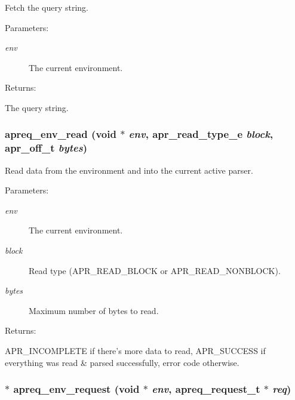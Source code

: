 Fetch the query string. \begin{Desc}
\item[Parameters: ]\par
\begin{description}
\item[{\em 
env}]The current environment. \end{description}
\end{Desc}
\begin{Desc}
\item[Returns: ]\par
The query string. \end{Desc}
\subsubsection{ apreq\_\-env\_\-read ({\bf void} $\ast$ {\em env}, {\bf apr\_\-read\_\-type\_\-e} {\em block}, {\bf apr\_\-off\_\-t} {\em bytes})}\label{group__ENV_a8}


Read data from the environment and into the current active parser. \begin{Desc}
\item[Parameters: ]\par
\begin{description}
\item[{\em 
env}]The current environment. \item[{\em 
block}]Read type (APR\_\-READ\_\-BLOCK or APR\_\-READ\_\-NONBLOCK). \item[{\em 
bytes}]Maximum number of bytes to read. \end{description}
\end{Desc}
\begin{Desc}
\item[Returns: ]\par
APR\_\-INCOMPLETE if there's more data to read, APR\_\-SUCCESS if everything was read \& parsed successfully, error code otherwise. \end{Desc}
\subsubsection{$\ast$ apreq\_\-env\_\-request ({\bf void} $\ast$ {\em env}, {\bf apreq\_\-request\_\-t} $\ast$ {\em req})}\label{group__ENV_a4}


